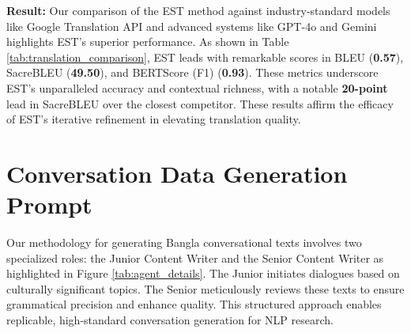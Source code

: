 \noindent \textbf{Result: } Our comparison of the EST method against industry-standard models like Google Translation API and advanced systems like GPT-4o and Gemini highlights EST's superior performance. As shown in Table \ref{tab:translation_comparison}, EST leads with remarkable scores in BLEU (\textbf{0.57}), SacreBLEU (\textbf{49.50}), and BERTScore (F1) (\textbf{0.93}). These metrics underscore EST's unparalleled accuracy and contextual richness, with a notable \textbf{20-point} lead in SacreBLEU over the closest competitor. These results affirm the efficacy of EST's iterative refinement in elevating translation quality.


\begin{table}[h]
\centering
\setlength{\tabcolsep}{1pt} 
\caption{Comparison of different translation models based on BLEU, SacreBLEU (SBLEU), BERTScore (BS) F1, and LLM scores.}
\label{tab:translation_comparison}
\end{table}


\section{Conversation Data Generation Prompt}
Our methodology for generating Bangla conversational texts involves two specialized roles: the Junior Content Writer and the Senior Content Writer as highlighted in Figure \ref{tab:agent_details}. The Junior initiates dialogues based on culturally significant topics. The Senior meticulously reviews these texts to ensure grammatical precision and enhance quality. This structured approach enables replicable, high-standard conversation generation for NLP research. 


